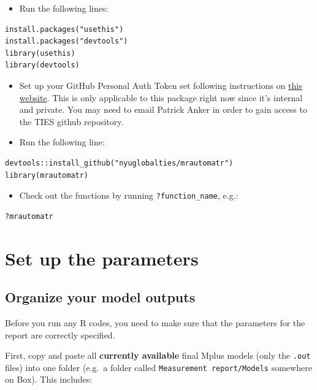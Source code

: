 \documentclass[
]{book}
\providecommand{\tightlist}{%
  \setlength{\itemsep}{0pt}\setlength{\parskip}{0pt}}
\begin{document}
\begin{itemize}
\tightlist
\item
  Run the following lines:
\end{itemize}

\begin{verbatim}
install.packages("usethis")
install.packages("devtools")
library(usethis)
library(devtools)
\end{verbatim}

\begin{itemize}
\item
  Set up your GitHub Personal Auth Token set following instructions on \href{https://usethis.r-lib.org/reference/browse_github_pat.html}{this website}. This is only applicable to this package right now since it's internal and private. You may need to email Patrick Anker in order to gain access to the TIES github repository.
\item
  Run the following line:
\end{itemize}

\begin{verbatim}
devtools::install_github("nyuglobalties/mrautomatr")
library(mrautomatr)
\end{verbatim}

\begin{itemize}
\tightlist
\item
  Check out the functions by running \texttt{?function\_name}, e.g.:
\end{itemize}

\begin{verbatim}
?mrautomatr
\end{verbatim}

\hypertarget{set-up-the-parameters}{%
\chapter{Set up the parameters}\label{set-up-the-parameters}}

\hypertarget{organize-your-model-outputs}{%
\section{Organize your model outputs}\label{organize-your-model-outputs}}

Before you run any R codes, you need to make sure that the parameters for the report are correctly specified.

First, copy and paste all \textbf{currently available} final Mplus models (only the \texttt{.out} files) into one folder (e.g.~a folder called \texttt{Measurement\ report/Models} somewhere on Box). This includes:
\end{document}
